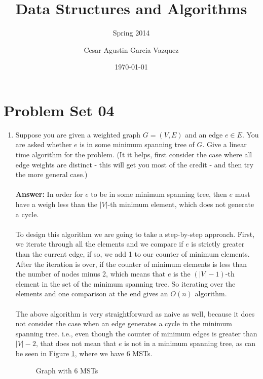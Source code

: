 \documentclass[tikz, 12pt]{scrartcl}
\title{Data Structures and Algorithms}
\subtitle{Spring 2014}
\author{Cesar Agustin Garcia Vazquez}
\date{\today}                                           %
\begin{document}
\maketitle
\section{Problem Set 04}

\begin{enumerate}
	\item Suppose you are given a weighted graph $G = (V, E)$ and an edge $e \in E$. You are asked whether $e$ is in some minimum spanning tree of $G$. Give a linear time algorithm for the problem. (It it helps, first consider the case where all edge weights are distinct - this will get you most of the credit - and then try the more general case.)\\
	\\
	\textbf{Answer:  } In order for $e$ to be in some minimum spanning tree, then $e$ must have a weigh less than the $|V|$-th minimum element, which does not generate a cycle. \\
	\\
	To design this algorithm we are going to take a step-by-step approach. First, we iterate through all the elements and we compare if $e$ is strictly greater than the current edge, if so, we add 1 to our counter of minimum elements. After the iteration is over, if the counter of minimum elements is less than the number of nodes  minus 2, which means that $e$ is the $(|V| - 1)$-th element in the set of the minimum spanning tree. So iterating over the elements and one comparison at the end gives an $O(n)$ algorithm.\\
	\\
	The above algorithm is very straightforward as naive as well, because it does not consider the case when an edge generates a cycle in the minimum spanning tree. i.e., even though the counter of minimum edges is greater than $|V| - 2$, that does not mean that $e$ is not in a minimum spanning tree, as can be seen in Figure \ref{graphWith2MST}, where we have 6 MSTs.

\begin{figure}[ht!]
\centering	
{}
\caption{\label{graphWith2MST}Graph with 6 MSTs}
\end{figure}	


\end{enumerate}
\end{document}
